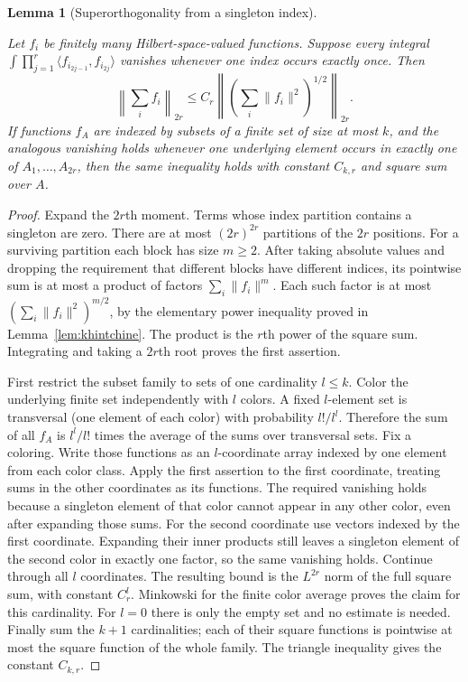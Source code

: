 \documentclass[11pt,oneside]{article}
\newtheorem{lemma}[theorem]{Lemma}
\theoremstyle{definition}\newtheorem{definition}[theorem]{Definition}
\theoremstyle{remark}\newtheorem{remark}[theorem]{Remark}
\newcommand{\bp}[1]{\leavevmode\par\nobreak\noindent{\normalfont\small\sffamily Blueprint identifier: \texttt{#1}.}\par\nobreak}
\begin{document}
\begin{lemma}[Superorthogonality from a singleton index]\label{lem:superorth}
\bp{singleton\_superorthogonality}
Let $f_i$ be finitely many Hilbert-space-valued functions. Suppose every
integral
$\int\prod_{j=1}^r\langle f_{i_{2j-1}},f_{i_{2j}}\rangle$ vanishes whenever
one index occurs exactly once. Then
\[
 \left\|\sum_i f_i\right\|_{2r}
 \leq C_r\left\|\left(\sum_i\|f_i\|^2\right)^{1/2}\right\|_{2r}.
\]
If functions $f_A$ are indexed by subsets of a finite set of size at most $k$,
and the analogous vanishing holds whenever one underlying element occurs
in exactly one of $A_1,\ldots,A_{2r}$, then the same inequality holds with
constant $C_{k,r}$ and square sum over $A$.
\end{lemma}
\begin{proof}
Expand the $2r$th moment. Terms whose index partition contains a singleton
are zero. There are at most $(2r)^{2r}$ partitions of the $2r$ positions.
For a surviving partition each block has size $m\geq2$. After taking absolute
values and dropping the requirement that different blocks have different
indices, its pointwise sum is at most a product of factors
$\sum_i\|f_i\|^m$. Each such factor is at most
$(\sum_i\|f_i\|^2)^{m/2}$, by the elementary power inequality proved in
Lemma~\ref{lem:khintchine}. The product is the $r$th power of the square sum.
Integrating and taking a $2r$th root proves the first assertion.

First restrict the subset family to sets of one cardinality $l\leq k$.
Color the underlying finite set independently with $l$ colors. A fixed
$l$-element set is transversal (one element of each color) with probability
$l!/l^l$. Therefore the sum of all $f_A$ is $l^l/l!$ times the average of the
sums over transversal sets. Fix a coloring. Write those functions as an
$l$-coordinate array indexed by one element from each color class. Apply the
first assertion to the first coordinate, treating sums in the other
coordinates as its functions. The required vanishing holds because a
singleton element of that color cannot appear in any other color, even after
expanding those sums. For the second coordinate use vectors indexed by the
first coordinate. Expanding their inner products still leaves a singleton
element of the second color in exactly one factor, so the same vanishing
holds. Continue through all $l$ coordinates. The resulting bound is the
$L^{2r}$ norm of the full square sum, with constant $C_r^l$.
Minkowski for the finite color average proves the claim for this cardinality.
For $l=0$ there is only the empty set and no estimate is needed.
Finally sum the $k+1$ cardinalities; each of their square functions is
pointwise at most the square function of the whole family. The triangle
inequality gives the constant $C_{k,r}$.
\end{proof}
\end{document}
